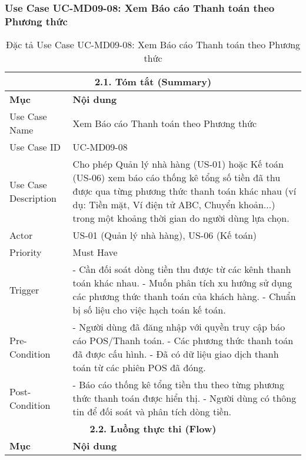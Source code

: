 \subsubsection{Use Case UC-MD09-08: Xem Báo cáo Thanh toán theo Phương thức}
\begin{longtable}{|m{4cm}|p{11cm}|}
\caption{Đặc tả Use Case UC-MD09-08: Xem Báo cáo Thanh toán theo Phương thức} \label{tab:uc_md09_08_corrected} \\
\hline
\multicolumn{2}{|c|}{\textbf{2.1. Tóm tắt (Summary)}} \\
\hline
\textbf{Mục} & \textbf{Nội dung} \\
\hline
\endhead %
\midrule
\endfoot %
\bottomrule
\endlastfoot %
Use Case Name & Xem Báo cáo Thanh toán theo Phương thức \\
\hline
Use Case ID & UC-MD09-08 \\
\hline
Use Case Description & Cho phép Quản lý nhà hàng (US-01) hoặc Kế toán (US-06) xem báo cáo thống kê tổng số tiền đã thu được qua từng phương thức thanh toán khác nhau (ví dụ: Tiền mặt, Ví điện tử ABC, Chuyển khoản...) trong một khoảng thời gian do người dùng lựa chọn. \\
\hline
Actor & US-01 (Quản lý nhà hàng), US-06 (Kế toán) \\
\hline
Priority & Must Have \\
\hline
Trigger & - Cần đối soát dòng tiền thu được từ các kênh thanh toán khác nhau. \newline - Muốn phân tích xu hướng sử dụng các phương thức thanh toán của khách hàng. \newline - Chuẩn bị số liệu cho việc hạch toán kế toán. \\
\hline
Pre-Condition & - Người dùng đã đăng nhập với quyền truy cập báo cáo POS/Thanh toán. \newline - Các phương thức thanh toán đã được cấu hình. \newline - Đã có dữ liệu giao dịch thanh toán từ các phiên POS đã đóng. \\
\hline
Post-Condition & - Báo cáo thống kê tổng tiền thu theo từng phương thức thanh toán được hiển thị. \newline - Người dùng có thông tin để đối soát và phân tích dòng tiền. \\
\hline
\multicolumn{2}{|c|}{\textbf{2.2. Luồng thực thi (Flow)}} \\
\hline
\textbf{Mục} & \textbf{Nội dung} \\
\hline

\end{longtable}
